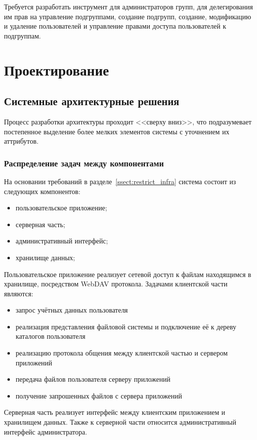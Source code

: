 \documentclass[utf8,usehyperref,12pt]{G7-32}
\begin{document}
Требуется разработать инструмент для администраторов групп, для делегирования им прав на управление подгруппами, создание подгрупп, создание, модификацию и удаление пользователей и управление правами доступа пользователей к подгруппам.

\chapter{Проектирование}
\section{Системные архитектурные решения}
Процесс разработки архитектуры проходит <<сверху вниз>>, что подразумевает постепенное выделение более мелких элементов системы с уточнением их аттрибутов.

\subsection{Распределение задач между компонентами}

На основании требований в разделе~\ref{ssect:restrict_infra} система состоит из следующих компонентов:
\begin{itemize}
\item пользовательское приложение;
\item серверная часть;
\item административный интерфейс;
\item хранилище данных;
\end{itemize}

Пользовательское приложение реализует сетевой доступ к файлам находящимся в хранилище, посредством WebDAV протокола. Задачами клиентской части являются:
\begin{itemize}
\item запрос учётных данных пользователя
\item реализация представления файловой системы и подключение её к дереву каталогов пользователя
\item реализацию протокола общения между клиентской частью и сервером приложений
\item передача файлов пользователя серверу приложений
\item получение запрошенных файлов с сервера приложений
\end{itemize}

Серверная часть реализует интерфейс между клиентским приложением и хранилищем данных. Также к серверной части относится административный интерфейс администратора.
\end{document}
